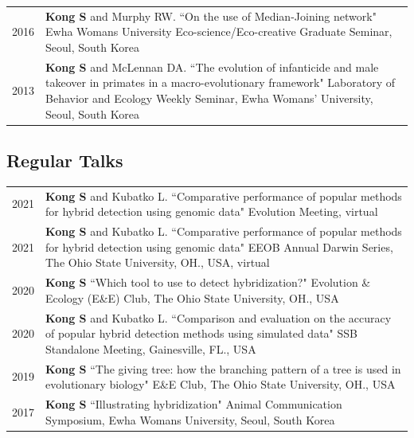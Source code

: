 \documentclass[11pt]{article}
\begin{document}
\begin{longtable}{p{}  p{}}
2016 & \textbf{Kong S} and Murphy RW. ``On the use of Median-Joining network" Ewha Womans University Eco-science/Eco-creative Graduate Seminar, Seoul, South Korea \vspace{5pt} \\

2013 & \textbf{Kong S} and McLennan DA. ``The evolution of infanticide and male takeover in primates in a macro-evolutionary framework" Laboratory of Behavior and Ecology Weekly Seminar, Ewha Womans’ University, Seoul, South Korea \vspace{5pt} \\ 
\end{longtable}

\subsection*{Regular Talks}
\begin{longtable}{p{}  p{}}
2021 & \textbf{Kong S} and Kubatko L.  ``Comparative performance of popular methods for hybrid detection using genomic data" Evolution Meeting, virtual \textit{} \vspace{5pt} \\ 
2021 & \textbf{Kong S} and Kubatko L.  ``Comparative performance of popular methods for hybrid detection using genomic data" EEOB Annual Darwin Series, The Ohio State University, OH., USA, virtual \vspace{5pt} \\ 
2020 & \textbf{Kong S} ``Which tool to use to detect hybridization?" Evolution \& Ecology (E\&E) Club, The Ohio State University, OH., USA \vspace{5pt} \\
2020 & \textbf{Kong S} and Kubatko L.  ``Comparison and evaluation on the accuracy of popular hybrid detection methods using simulated data" SSB Standalone Meeting, Gainesville, FL., USA \vspace{5pt} \\ 
2019 &  \textbf{Kong S} ``The giving tree: how the branching pattern of a tree is used in evolutionary biology" E\&E Club, The Ohio State University, OH., USA \vspace{5pt} \\  

2017 & \textbf{Kong S} ``Illustrating hybridization" Animal Communication Symposium, Ewha Womans University, Seoul, South Korea \vspace{5pt} \\  

\end{longtable}
\end{document}
